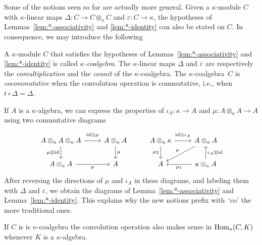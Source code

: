 \begin{rem}\label{rem:coalgebra}
    Some of the notions seen so far are actually more general. Given a $\kappa$-module $C$ with $\kappa$-linear maps $\Delta\colon C\to C\otimes_\kappa C$ and $\varepsilon\colon C\to\kappa$, the hypotheses of Lemmas~\ref{lem:*-associativity} and \ref{lem:*-identity} can also be stated on $C$. In consequence, we may introduce the following
\end{rem}

\begin{defn}\label{defn:co-bi-algebra}
    A $\kappa$-module $C$ that satisfies the hypotheses of Lemmas~\ref{lem:*-associativity} and \ref{lem:*-identity} is called \textsl{$\kappa$-coalgebra}. The $\kappa$-linear maps $\Delta$ and $\varepsilon$ are respectively the \textsl{comultiplication} and the \textsl{counit} of the $\kappa$-coalgebra. The $\kappa$-coalgebra~$C$ is \textsl{cocommutative} when the convolution operation is commutative, i.e., when $t\circ\Delta=\Delta$.
\end{defn}

\begin{rem}
    If $A$ is a $\kappa$-algebra, we can express the properties of $\iota_A\colon\kappa\to A$ and $\mu\colon A\otimes_\kappa A\to A$ using two commutative diagrams
    $$
        \begin{tikzcd}
            A\otimes_\kappa A\otimes_\kappa A
                    \arrow[d,"\mu\otimes\id"']
                    \arrow[r,"\vphantom{\big(}\id\otimes\mu"]
                &A\otimes_\kappa A
                    \arrow[d,"\mu"]
                &A\otimes_\kappa\kappa
                    \arrow[r,"\vphantom{\big(}\id\otimes\iota_A"]
                    \arrow[d,"\mu_2"']
                &A\otimes_\kappa A
                    \arrow[dl,"\mu"']\\
            A\otimes_\kappa A
                    \arrow[r,"\mu"']
                &A
                &A
                &\kappa\otimes_\kappa A
                    \arrow[u,"\iota_A\otimes\id"']
                    \arrow[l,"\mu_1"]
        \end{tikzcd}
    $$
    After reversing the directions of $\mu$ and $\iota_A$ in these diagrams, and labeling them with $\Delta$ and $\varepsilon$, we obtain the diagrams of Lemma~\ref{lem:*-associativity} and Lemma~\ref{lem:*-identity}. This explains why the new notions prefix with~`co' the more traditional ones.
\end{rem}

\begin{rem}\label{rem:coalgebra-convolution}
    If $C$ is is $\kappa$-coalgebra the convolution operation also makes sense in ${\rm Hom}_\kappa(C,K)$ whenever $K$ is a $\kappa$-algebra.
\end{rem}

